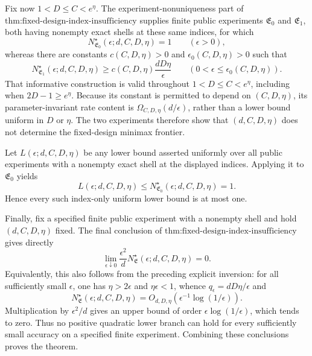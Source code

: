 Fix now \(1<D\le C<e^\eta\). The experiment-nonuniqueness part of \(\text{thm:fixed-design-index-insufficiency}\) supplies finite public experiments \(\mathfrak E_0\) and \(\mathfrak E_1\), both having nonempty exact shells at these same indices, for which
\[
N^\star_{\mathfrak E_0}(\epsilon;d,C,D,\eta)=1
\qquad(\epsilon>0),
\]
whereas there are constants \(c(C,D,\eta)>0\) and \(\epsilon_0(C,D,\eta)>0\) such that
\[
N^\star_{\mathfrak E_1}(\epsilon;d,C,D,\eta)
\ge c(C,D,\eta)\frac{dD\eta}{\epsilon}
\qquad(0<\epsilon\le\epsilon_0(C,D,\eta)).
\]
That informative construction is valid throughout \(1<D\le C<e^\eta\), including when \(2D-1\ge e^\eta\). Because its constant is permitted to depend on \((C,D,\eta)\), its parameter-invariant rate content is \(\Omega_{C,D,\eta}(d/\epsilon)\), rather than a lower bound uniform in \(D\) or \(\eta\). The two experiments therefore show that \((d,C,D,\eta)\) does not determine the fixed-design minimax frontier.

Let \(L(\epsilon;d,C,D,\eta)\) be any lower bound asserted uniformly over all public experiments with a nonempty exact shell at the displayed indices. Applying it to \(\mathfrak E_0\) yields
\[
L(\epsilon;d,C,D,\eta)
\le N^\star_{\mathfrak E_0}(\epsilon;d,C,D,\eta)=1.
\]
Hence every such index-only uniform lower bound is at most one.

Finally, fix a specified finite public experiment with a nonempty shell and hold \((d,C,D,\eta)\) fixed. The final conclusion of \(\text{thm:fixed-design-index-insufficiency}\) gives directly
\[
\lim_{\epsilon\downarrow0}
\frac{\epsilon^2}{d}N^\star_{\mathfrak E}(\epsilon;d,C,D,\eta)=0.
\]
Equivalently, this also follows from the preceding explicit inversion: for all sufficiently small \(\epsilon\), one has \(\eta>2\epsilon\) and \(\eta\epsilon<1\), whence \(q_\epsilon=dD\eta/\epsilon\) and
\[
N^\star_{\mathfrak E}(\epsilon;d,C,D,\eta)
=O_{d,D,\eta}\!\left(\epsilon^{-1}\log(1/\epsilon)\right).
\]
Multiplication by \(\epsilon^2/d\) gives an upper bound of order \(\epsilon\log(1/\epsilon)\), which tends to zero. Thus no positive quadratic lower branch can hold for every sufficiently small accuracy on a specified finite experiment. Combining these conclusions proves the theorem.
